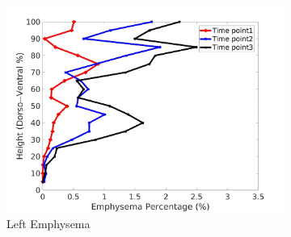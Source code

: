 \begin{figure}[H]
\begin{subfigure}{.42\linewidth}
  \includegraphics[width=\linewidth,trim={{.0\wd0} {.0\wd0} {.0\wd0} {.0\wd0}},clip]{QuantitativeAnalysis/Image/IPF21LeftLungEmphysemaDiseaseDorsoToVentral.jpg} %
  \caption{Left Emphysema}
  \label{fig:IPF21DiseaseDorsoToVentralMain-g} 
\end{subfigure} 
\begin{subfigure}{.42\linewidth}%

\end{subfigure}
\end{figure}
